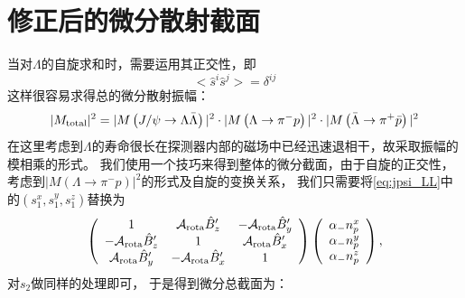\section{修正后的微分散射截面}
当对$\Lambda$的自旋求和时，需要运用其正交性，即
\begin{equation}
    <\hat{s}^{i} \hat{s}^{j} > = \delta^{ij}
\end{equation}
这样很容易求得总的微分散射振幅：
\begin{equation}
    |M_{\rm total}|{}^{2} = |M\left(J/\psi \to\Lambda \bar{\Lambda} \right)|^{2} 
                       \cdot |M\left(\Lambda \to \pi^{-} p\right)|^{2}
                       \cdot |M\left(\bar{\Lambda} \to \pi^{+} \bar{p}\right)|^{2}
\end{equation}
在这里考虑到$\Lambda$的寿命很长在探测器内部的磁场中已经迅速退相干，故采取振幅的模相乘的形式。
我们使用一个技巧来得到整体的微分截面，由于自旋的正交性，
考虑到$|M\left(\Lambda \to \pi^{-} p\right)|^{2}$的形式及自旋的变换关系，
我们只需要将\ref{eq:jpsi_LL}中的$(s_1^{x}, s_1^{y}, s_1^{z})$替换为
\begin{equation}
    \left(
    \begin{array}{ccc}
        1                        & \mathcal{A}_{\rm rota} \hat{B}'_{z}     & -\mathcal{A}_{\rm rota} \hat{B}'_{y} \\
        - \mathcal{A}_{\rm rota}  \hat{B}'_{z} & 1                         
        & \mathcal{A}_{\rm rota} \hat{B}'_{x}  \\
        \mathcal{A}_{\rm rota} \hat{B}'_{y}    & - \mathcal{A}_{\rm rota}  \hat{B}'_{x} & 1                      
    \end{array}
    \right)
    \left(%
    \begin{array} {c}
        \alpha_{-} n^x _{p} \\
        \alpha_{-}  n^y_{p} \\
        \alpha_{-}  n^z_{p} 
    \end{array}
    \right),
\end{equation}
对$s_2$做同样的处理即可， 于是得到微分总截面为：
